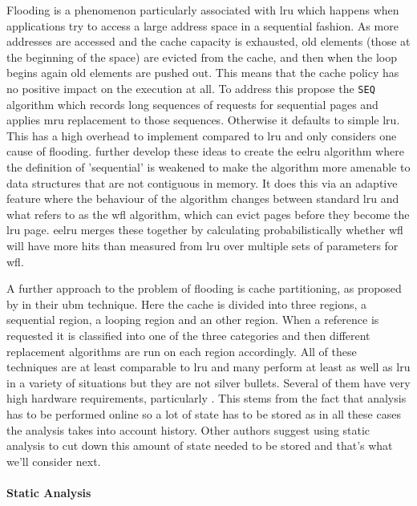 Flooding is a phenomenon particularly associated with \gls{lru} which happens when applications try to access a large address space in a sequential fashion. As more addresses are accessed and the cache capacity is exhausted, old elements (those at the beginning of the space) are evicted from the cache, and then when the loop begins again old elements are pushed out. This means that the cache policy has no positive impact on the execution at all. To address this \citet{glassAdaptivePageReplacement1997} propose the \texttt{SEQ} algorithm which records long sequences of requests for sequential pages and applies \gls{mru} replacement to those sequences. Otherwise it defaults to simple \gls{lru}. This has a high overhead to implement compared to \gls{lru} and only considers one cause of flooding. \citet{smaragdakisEELRUSimpleEffective1999} further develop these ideas to create the \gls{eelru} algorithm where the definition of 'sequential' is weakened to make the algorithm more amenable to data structures that are not contiguous in memory. It does this via an adaptive feature where the behaviour of the algorithm changes between standard \gls{lru} and what \citeauthor{smaragdakisEELRUSimpleEffective1999} refers to as the \gls{wfl} algorithm, which can evict pages before they become the \gls{lru} page. \gls{eelru} merges these together by calculating probabilistically whether \gls{wfl} will have more hits than measured from \gls{lru} over multiple sets of parameters for \gls{wfl}.

A further approach to the problem of flooding is cache partitioning, as proposed by \citeauthor{kimLowoverheadHighperformanceUnified2000} in their \gls{ubm} technique. Here the cache is divided into three regions, a sequential region, a looping region and an other region. When a reference is requested it is classified into one of the three categories and then different replacement algorithms are run on each region accordingly. All of these techniques are at least comparable to \gls{lru} and many perform at least as well as \gls{lru} in a variety of situations but they are not silver bullets. Several of them have very high hardware requirements, particularly \citet{kimLowoverheadHighperformanceUnified2000}. This stems from the fact that analysis has to be performed online so a lot of state has to be stored as in all these cases the analysis takes into account history. Other authors suggest using static analysis to cut down this amount of state needed to be stored and that's what we'll consider next.

\paragraph{Static Analysis}


